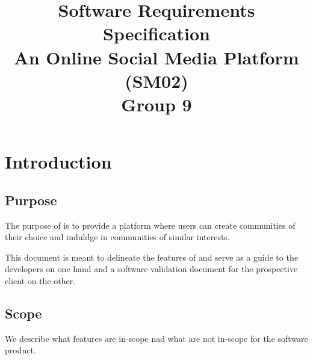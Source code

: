 \documentclass[conference,compsoc]{IEEEtran}
\newcommand{\Name}{}
\begin{document}
\title{Software Requirements Specification\\ An Online Social Media Platform\\(SM02)\\Group 9}

\author{
    \and
    \and
    \and
    }
\maketitle
\IEEEpeerreviewmaketitle

\tableofcontents

\section{Introduction}
\subsection{Purpose}
The purpose of \Name is to provide a platform where users can create communities of their choice and induldge in communities of similar interests.

This document is meant to delineate the features of \Name and serve as a guide to the developers on one hand and a software validation document for the prospective client on the other.

\subsection{Scope}
We describe what features are in-scope nad what are not in-scope for the software product.
\end{document}
